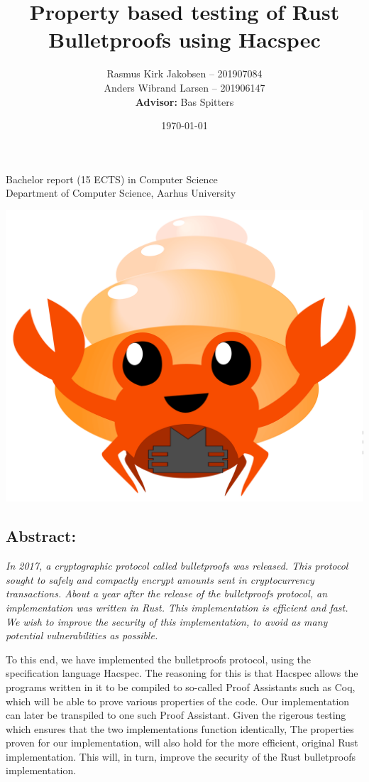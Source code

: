 \documentclass{article}
\title{Property based testing of Rust Bulletproofs using Hacspec}
\author{ 
Rasmus Kirk Jakobsen -- 201907084\\
Anders Wibrand Larsen -- 201906147\\
\textbf{Advisor:} Bas Spitters
}
\date{\today}
\begin{document}
\maketitle

\begin{center}
    Bachelor report (15 ECTS) in Computer Science\\
Department of Computer Science, Aarhus University\\
\end{center} 

\begin{center}
	\includegraphics[scale=0.4]{img/bulletproof-hacspec-2.png}
\end{center} 

\subsection*{Abstract:}

{\itshape
	In 2017, a cryptographic protocol called bulletproofs was
	released. This protocol sought to safely and compactly encrypt
	amounts sent in cryptocurrency transactions. About a year after
	the release of the bulletproofs protocol, an implementation
	was written in Rust. This implementation is efficient and
	fast. We wish to improve the security of this implementation,
	to avoid as many potential vulnerabilities as possible.
	
	To this end, we have implemented the bulletproofs protocol,
	using the specification language Hacspec. The reasoning for
	this is that Hacspec allows the programs written in it to be
	compiled to so-called Proof Assistants such as Coq, which
	will be able to prove various properties of the code. Our
	implementation can later be transpiled to one such Proof
	Assistant. Given the rigerous testing which ensures that the
	two implementations function identically, The properties proven
	for our implementation, will also hold for the more efficient,
	original Rust implementation. This will, in turn, improve the
	security of the Rust bulletproofs implementation.
}
\end{document}
